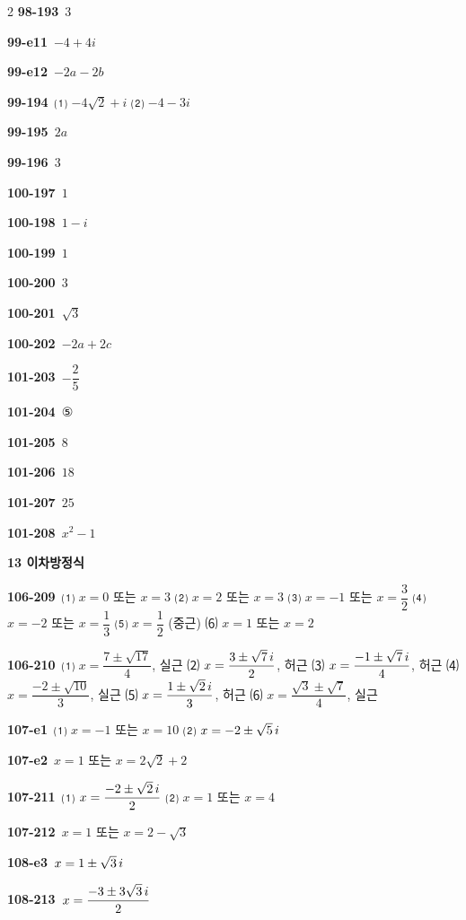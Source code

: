 \documentclass[10pt,a4paper]{article}
\begin{document}
\begin{multicols}{2}
\noindent\textbf{98-193}\ $3$\par
\noindent\textbf{99-e11}\ $-4+4i$\par
\noindent\textbf{99-e12}\ $-2a-2b$\par
\noindent\textbf{99-194}\ ⑴ $-4\sqrt{2}+i$ ⑵ $-4-3i$\par
\noindent\textbf{99-195}\ $2a$\par
\noindent\textbf{99-196}\ $3$\par
\noindent\textbf{100-197}\ $1$\par
\noindent\textbf{100-198}\ $1-i$\par
\noindent\textbf{100-199}\ $1$\par
\noindent\textbf{100-200}\ $3$\par
\noindent\textbf{100-201}\ $\sqrt{3}$\par
\noindent\textbf{100-202}\ $-2a+2c$\par
\noindent\textbf{101-203}\ $-\dfrac{2}{5}$\par
\noindent\textbf{101-204}\ ⑤\par
\noindent\textbf{101-205}\ $8$\par
\noindent\textbf{101-206}\ $18$\par
\noindent\textbf{101-207}\ $25$\par
\noindent\textbf{101-208}\ $x^2-1$\par
\noindent\textbf{13 이차방정식}\par\smallskip
\noindent\textbf{106-209}\ ⑴ $x=0$ 또는 $x=3$ ⑵ $x=2$ 또는 $x=3$ ⑶ $x=-1$ 또는 $x=\dfrac{3}{2}$ ⑷ $x=-2$ 또는 $x=\dfrac{1}{3}$ ⑸ $x=\dfrac{1}{2}$ (중근) ⑹ $x=1$ 또는 $x=2$\par
\noindent\textbf{106-210}\ ⑴ $x=\dfrac{7\pm\sqrt{17}}{4}$, 실근 ⑵ $x=\dfrac{3\pm\sqrt{7}\mkern3mu i}{2}$, 허근 ⑶ $x=\dfrac{-1\pm\sqrt{7}\mkern3mu i}{4}$, 허근 ⑷ $x=\dfrac{-2\pm\sqrt{10}}{3}$, 실근 ⑸ $x=\dfrac{1\pm\sqrt{2}\mkern3mu i}{3}$, 허근 ⑹ $x=\dfrac{\sqrt{3}\pm\sqrt{7}}{4}$, 실근\par
\noindent\textbf{107-e1}\ ⑴ $x=-1$ 또는 $x=10$ ⑵ $x=-2\pm\sqrt{5}\mkern3mu i$\par
\noindent\textbf{107-e2}\ $x=1$ 또는 $x=2\sqrt{2}+2$\par
\noindent\textbf{107-211}\ ⑴ $x=\dfrac{-2\pm\sqrt{2}\mkern3mu i}{2}$ ⑵ $x=1$ 또는 $x=4$\par
\noindent\textbf{107-212}\ $x=1$ 또는 $x=2-\sqrt{3}$\par
\noindent\textbf{108-e3}\ $x=1\pm\sqrt{3}\mkern3mu i$\par
\noindent\textbf{108-213}\ $x=\dfrac{-3\pm 3\sqrt{3}\mkern3mu i}{2}$\par

\end{multicols}
\end{document}
